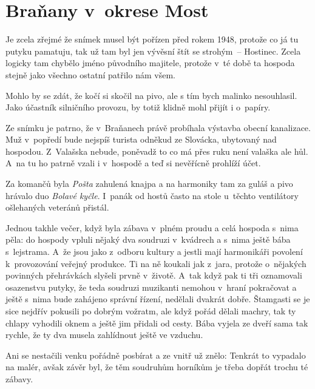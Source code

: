 
\chapter{Braňany v~okrese Most}

Je zcela zřejmé že snímek musel být pořízen před rokem 1948, protože co já tu
putyku pamatuju, tak už tam byl jen vývěsní štít se strohým~-- Hostinec. Zcela
logicky tam chybělo jméno původního majitele, protože v~té době ta hospoda
stejně jako všechno ostatní patřilo nám všem.


Mohlo by se zdát, že kočí si skočil na pivo, ale s tím bych malinko
nesouhlasil. Jako účastník silničního provozu, by totiž klidně mohl přijít i
o~papíry.

Ze snímku je patrno, že v~Braňanech právě probíhala výstavba obecní kanalizace.
Muž v~popředí bude nejspíš turista odněkud ze Slovácka, ubytovaný nad hospodou.
Z~Valašska nebude, poněvadž to co má přes ruku není valaška ale hůl. A~na tu ho
patrně vzali i v~hospodě a teď si nevěřícně prohlíží účet.

Za komančů byla {\em Pošta} zahulená knajpa a na harmoniky tam za guláš a pivo
hrávalo duo {\em Bolavé kyčle}. I~panák od hostů často na stole u~těchto
ventilátory ošlehaných veteránů přistál.

Jednou takhle večer, když byla zábava v~plném proudu a celá hospoda s~nima
pěla:  do
hospody vpluli nějaký dva soudruzi v~kvádrech a s~nima ještě bába s~lejstrama.
A~že jsou jako z~odboru kultury a jestli mají harmonikáři povolení
k~provozování veřejný produkce. Ti na ně koukali jak z~jara, protože o~nějakých
povinných přehrávkách slyšeli prvně v~životě. A~tak když pak ti tři oznamovali
osazenstvu putyky, že teda soudruzi muzikanti nemohou v~hraní pokračovat a
ještě s~nima bude zahájeno správní řízení, nedělali dvakrát dobře. Štamgasti se
je sice nejdřív pokusili po dobrým vožratm, ale když pořád dělali machry, tak
ty chlapy vyhodili oknem a ještě jim přidali od cesty. Bába vyjela ze dveří
sama tak rychle, že ty dva musela zahlídnout ještě ve vzduchu.

Ani se nestačili venku pořádně posbírat a ze vnitř už znělo:  Tenkrát to vypadalo na malér, avšak závěr byl, že těm
soudruhům horníkům je třeba dopřát trochu té zábavy.

